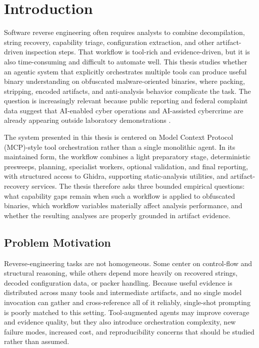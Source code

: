 \chapter{Introduction}
\label{sec:intro}

Software reverse engineering often requires analysts to combine decompilation, string recovery, capability triage, configuration extraction, and other artifact-driven inspection steps. That workflow is tool-rich and evidence-driven, but it is also time-consuming and difficult to automate well. This thesis studies whether an agentic system that explicitly orchestrates multiple tools can produce useful binary understanding on obfuscated malware-oriented binaries, where packing, stripping, encoded artifacts, and anti-analysis behavior complicate the task. The question is increasingly relevant because public reporting and federal complaint data suggest that AI-enabled cyber operations and AI-assisted cybercrime are already appearing outside laboratory demonstrations \cite{anthropic2025espionage,fbi2025ic3}.

The system presented in this thesis is centered on Model Context Protocol (MCP)-style tool orchestration rather than a single monolithic agent. In its maintained form, the workflow combines a light preparatory stage, deterministic presweeps, planning, specialist workers, optional validation, and final reporting, with structured access to Ghidra, supporting static-analysis utilities, and artifact-recovery services. The thesis therefore asks three bounded empirical questions: what capability gaps remain when such a workflow is applied to obfuscated binaries, which workflow variables materially affect analysis performance, and whether the resulting analyses are properly grounded in artifact evidence.

\section{Problem Motivation}

Reverse-engineering tasks are not homogeneous. Some center on control-flow and structural reasoning, while others depend more heavily on recovered strings, decoded configuration data, or packer handling. Because useful evidence is distributed across many tools and intermediate artifacts, and no single model invocation can gather and cross-reference all of it reliably, single-shot prompting is poorly matched to this setting. Tool-augmented agents may improve coverage and evidence quality, but they also introduce orchestration complexity, new failure modes, increased cost, and reproducibility concerns that should be studied rather than assumed.

